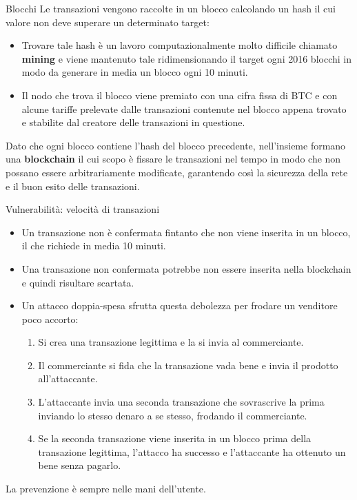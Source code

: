 \documentclass[italian]{beamer}
\begin{document}
\begin{frame}{Blocchi} %
Le transazioni vengono raccolte in un blocco calcolando un hash il cui valore non deve superare un determinato target:
\begin{itemize}
 \item Trovare tale hash è un lavoro computazionalmente molto difficile chiamato \textbf{mining} e viene mantenuto tale ridimensionando il target ogni 2016 blocchi in modo da generare in media un blocco ogni 10 minuti.
 \item Il nodo che trova il blocco viene premiato con una cifra fissa di BTC e con alcune tariffe prelevate dalle transazioni contenute nel blocco appena trovato e stabilite dal creatore delle transazioni in questione.
\end{itemize}
Dato che ogni blocco contiene l'hash del blocco precedente, nell'insieme formano una \textbf{blockchain} il cui scopo è fissare le transazioni nel tempo in modo che non possano essere arbitrariamente modificate, garantendo così la sicurezza della rete e il buon esito delle transazioni.
\end{frame}


\begin{frame}{Vulnerabilità: velocità di transazioni} %
 \begin{itemize}
  \item Un transazione non è confermata fintanto che non viene inserita in un blocco, il che richiede in media 10 minuti.
  \item Una transazione non confermata potrebbe non essere inserita nella blockchain e quindi risultare scartata.
  \item Un attacco doppia-spesa sfrutta questa debolezza per frodare un venditore poco accorto: \pause
  \begin{enumerate}
   \item Si crea una transazione legittima e la si invia al commerciante. \pause
   \item Il commerciante si fida che la transazione vada bene e invia il prodotto all'attaccante. \pause
   \item L'attaccante invia una seconda transazione che sovrascrive la prima inviando lo stesso denaro a se stesso, frodando il commerciante. \pause
   \item Se la seconda transazione viene inserita in un blocco prima della transazione legittima, l'attacco ha successo e l'attaccante ha ottenuto un bene senza pagarlo.
  \end{enumerate}
 \end{itemize}
 \pause
 La prevenzione è sempre nelle mani dell'utente.
\end{frame}
\end{document}
